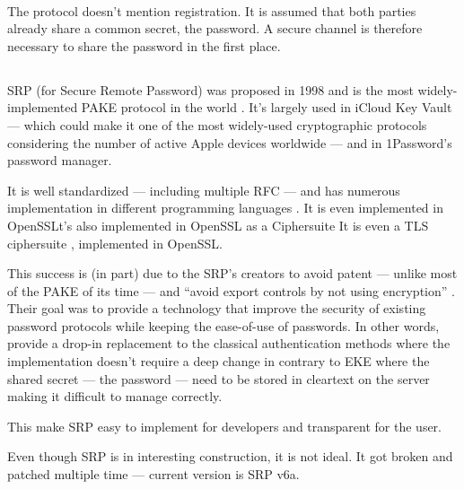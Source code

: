 \documentclass[../report.tex]{subfiles}
\begin{document}

\paragraph{}
The protocol doesn't mention registration. It is assumed that both parties already share a common secret, the password. A secure channel is therefore necessary to share the password in the first place.





\subsection{}

SRP \cite{SRP_Paper, SRP_6_Paper} (for Secure Remote Password) was proposed in 1998 and is the most widely-implemented PAKE protocol in the world \cite{PAKE_Green_blog}.
It's largely used in iCloud Key Vault --- which could make it one of the most widely-used cryptographic protocols \cite{PAKE_Green_blog} considering the number of active Apple devices worldwide --- and in 1Password's password manager.

It is well standardized --- including multiple RFC --- and has numerous implementation in different programming languages \cite{http://srp.stanford.edu/links.html}.
It is even implemented in OpenSSLt's also implemented in OpenSSL as a Ciphersuite
It is even a TLS ciphersuite \cite{SRP_RFC_3}, implemented in OpenSSL.

This success is (in part) due to the SRP's creators to avoid patent --- unlike most of the PAKE of its time --- and ``avoid export controls by not using encryption'' \cite{Formal Methods Analysis of the Secure Remote Password Protocol (2020)}.
Their goal was to provide a technology that improve the security of existing password protocols while keeping the ease-of-use of passwords. In other words, provide a drop-in replacement to the classical authentication methods where the implementation doesn't require a deep change in contrary to EKE where the shared secret --- the password --- need to be stored in cleartext on the server making it difficult to manage correctly.

This make SRP easy to implement for developers and transparent for the user.


Even though SRP is in interesting construction, it is not ideal.
It got broken and patched multiple time --- current version is SRP v6a. %
\end{document}
